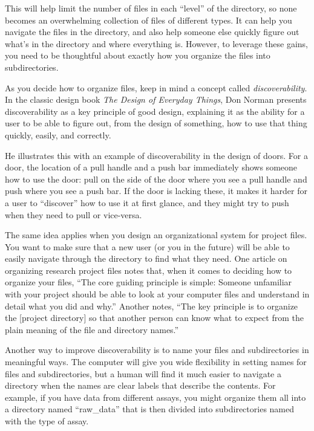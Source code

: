 \documentclass[]{tufte-book}
\begin{document}
This will help limit the number of files in each ``level'' of the directory, so
none becomes an overwhelming collection of files of different types. It can help
you navigate the files in the directory, and also help someone else quickly
figure out what's in the directory and where everything is. However,
to leverage these gains, you need to be thoughtful about exactly how you
organize the files into subdirectories.

As you decide how to organize files, keep in mind a concept called
\emph{discoverability}. In the classic design book \emph{The Design of Everyday
Things}, Don Norman presents discoverability as a key principle of good design,
explaining it as the ability for a user to be able to figure out, from the design
of something, how to use that thing quickly, easily, and correctly.

He illustrates this with an example of discoverability in the design of doors.
For a door, the location of a pull handle and a push bar immediately shows
someone how to use the door: pull on the side of the door where you see a pull
handle and push where you see a push bar. If the door is lacking these, it makes
it harder for a user to ``discover'' how to use it at first glance, and they might
try to push when they need to pull or vice-versa.

The same idea applies when you design an organizational system for project
files. You want to make sure that a new user (or you in the future) will be able
to easily navigate through the directory to find what they need. One article on
organizing research project files notes that, when it comes to deciding how to
organize your files, ``The core guiding principle is simple: Someone unfamiliar
with your project should be able to look at your computer files and understand
in detail what you did and why.'' \citep{noble2009quick} Another notes, ``The key
principle is to organize the {[}project directory{]} so that another person can know
what to expect from the plain meaning of the file and directory names.''
\citep{marwick2018packaging}

Another way to improve discoverability is to name your files and subdirectories
in meaningful ways. The computer will give you wide flexibility in setting
names for files and subdirectories, but a human will find it much easier to
navigate a directory when the names are clear labels that describe the contents.
For example, if you have data from different assays, you might organize them
all into a directory named ``raw\_data'' that is then divided into subdirectories
named with the type of assay.
\end{document}
